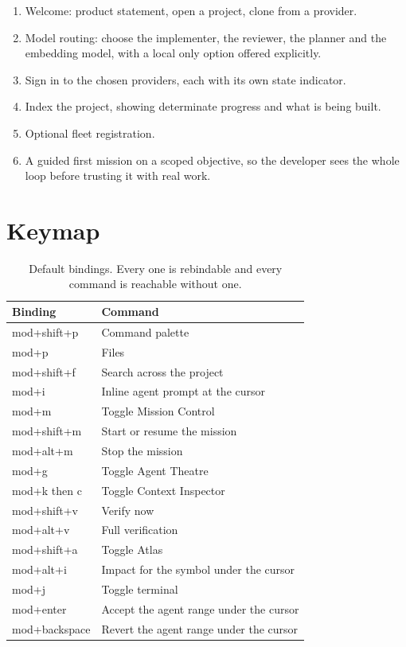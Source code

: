 \begin{enumerate}
  \item Welcome: product statement, open a project, clone from a provider.
  \item Model routing: choose the implementer, the reviewer, the planner and the embedding
  model, with a local only option offered explicitly.
  \item Sign in to the chosen providers, each with its own state indicator.
  \item Index the project, showing determinate progress and what is being built.
  \item Optional fleet registration.
  \item A guided first mission on a scoped objective, so the developer sees the whole loop
  before trusting it with real work.
\end{enumerate}

\section{Keymap}

\begin{table}[h]
\centering
\small
\begin{tabularx}{\textwidth}{l X}
\toprule
\textbf{Binding} & \textbf{Command} \\
\midrule
mod+shift+p & Command palette \\
mod+p & Files \\
mod+shift+f & Search across the project \\
mod+i & Inline agent prompt at the cursor \\
mod+m & Toggle Mission Control \\
mod+shift+m & Start or resume the mission \\
mod+alt+m & Stop the mission \\
mod+g & Toggle Agent Theatre \\
mod+k then c & Toggle Context Inspector \\
mod+shift+v & Verify now \\
mod+alt+v & Full verification \\
mod+shift+a & Toggle Atlas \\
mod+alt+i & Impact for the symbol under the cursor \\
mod+j & Toggle terminal \\
mod+enter & Accept the agent range under the cursor \\
mod+backspace & Revert the agent range under the cursor \\
\bottomrule
\end{tabularx}
\caption{Default bindings. Every one is rebindable and every command is reachable without one.}
\end{table}

